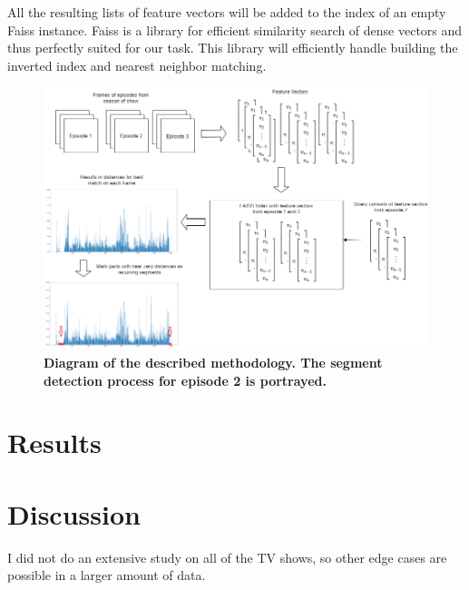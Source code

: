 \documentclass{article}
\begin{document}
All the resulting lists of feature vectors will be added to the index of an empty Faiss instance. Faiss is a library for efficient similarity search of dense vectors \cite{faiss, faiss-github} and thus perfectly suited for our task. This library will efficiently handle building the inverted index and nearest neighbor matching.

\begin{figure}[H]
	\includegraphics[width=\paperwidth, center, scale=0.7]{images/thesisdiagram.png}
	\centering
	\caption{\textbf{Diagram of the described methodology. The segment detection process for episode 2 is portrayed.}}
	\label{fig:diagram}
\end{figure}

\section{Results} \label{results}

\section{Discussion} \label{discussion}

I did not do an extensive study on all of the TV shows, so other edge cases are possible in a larger amount of data.



\end{document}
